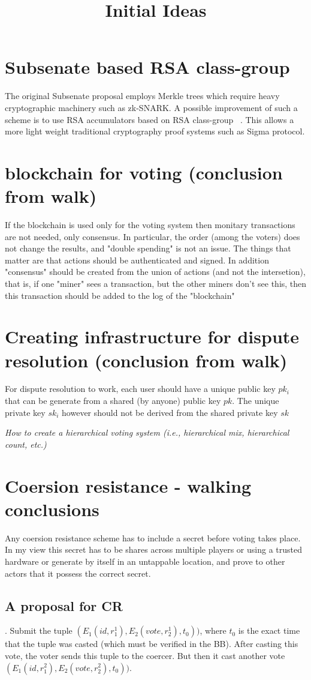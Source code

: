 \documentclass[]{paper}
\title{Initial Ideas}
\begin{document}
	\maketitle
 \section{Subsenate based RSA class-group}
  The original Subsenate proposal employs Merkle trees which require heavy cryptographic machinery such as zk-SNARK. A possible improvement of such a scheme is to use RSA accumulators based on RSA class-group ~\cite{boneh2019}. This allows a more light weight traditional cryptography proof systems such as Sigma protocol. 
 \section{blockchain for voting (conclusion from walk)}
 If the blockchain is used only for the voting system then monitary transactions are not needed, only consensus. In particular, the order (among the voters) does not change the results, and "double spending" is not an issue. The things that matter are that actions should be authenticated and signed. In addition  "consensus" should be created from the union of actions (and not the intersetion), that is, if one "miner" sees a transaction, but the other miners don't see this, then this transaction should be added to the log of the "blockchain"
 \section{Creating infrastructure for dispute resolution (conclusion from walk)}
 For dispute resolution to work, each user should have a unique public key $pk_i$ that can be generate from a shared (by anyone) public key $pk$. The unique private key $sk_i$ however should not be derived from the shared private key $sk$
 
	{\em How to create a hierarchical voting system (i.e., hierarchical mix, hierarchical count, etc.)}
\section{Coersion resistance - walking conclusions}
	Any coersion resistance scheme has to include a secret before voting takes place. In my view this secret has to be shares across multiple players or using a trusted hardware or generate by itself in an untappable location, and prove to other actors that it possess the correct secret.
	\subsection{A proposal for CR}. Submit the tuple $(E_1(id, r^1_1), E_2(vote,r^1_2), t_0))$, where $t_0$ is the exact time that the tuple was casted (which must be verified in the BB). After casting this vote, the voter sends this tuple to the coercer. But then it cast another vote  $(E_1(id, r^2_1), E_2(vote,r^2_2), t_0))$. 
\end{document}
